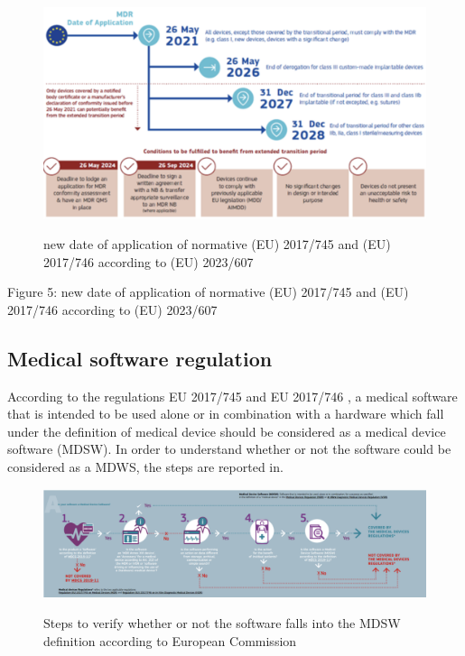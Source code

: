 \documentclass{Configuration_Files/PoliMi3i_thesis}
\begin{document}
\begin{figure}[H]
	\includegraphics[scale=0.3]{Ethics/Screenshot 2024-08-15 at 10.54.56.png}
	\centering
    \label{ethics_1}
    \caption{new date of application of normative (EU) 2017/745 and (EU) 2017/746 according to (EU) 2023/607 \cite{NewRevisedResource}}
\end{figure}


Figure 5: new date of application of normative (EU) 2017/745 and (EU) 2017/746 according to (EU) 2023/607 \cite{NewRevisedResource}

\subsection{Medical software regulation}

According to the regulations EU 2017/745 \cite{RegolamentoUE20172017} and EU 2017/746 \cite{RegolamentoUE20172017a}, a medical software that is intended to be used alone or in combination with a hardware which fall under the definition of medical device should be considered as a medical device software (MDSW). 
In order to understand whether or not the software could be considered as a MDWS, the steps are reported in.

\begin{figure}[H]

	\includegraphics[scale=0.3]{Ethics/Screenshot 2024-08-15 at 10.55.04.png}
	\centering
    \label{ethics_2}
    \caption{Steps to verify whether or not the software falls into the MDSW definition according to European Commission \cite{PublicHealthEuropean2024}}
\end{figure}
\end{document}
